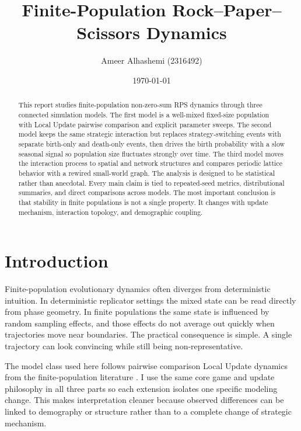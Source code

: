 \documentclass[11pt,a4paper]{article}
\title{Finite-Population Rock--Paper--Scissors Dynamics}
\author{Ameer Alhashemi (2316492)}
\date{\today}
\begin{document}
\raggedbottom
\maketitle
\onehalfspacing

\begin{abstract}
This report studies finite-population non-zero-sum RPS dynamics through three connected simulation models. The first model is a well-mixed fixed-size population with Local Update pairwise comparison and explicit parameter sweeps. The second model keeps the same strategic interaction but replaces strategy-switching events with separate birth-only and death-only events, then drives the birth probability with a slow seasonal signal so population size fluctuates strongly over time. The third model moves the interaction process to spatial and network structures and compares periodic lattice behavior with a rewired small-world graph. The analysis is designed to be statistical rather than anecdotal. Every main claim is tied to repeated-seed metrics, distributional summaries, and direct comparisons across models. The most important conclusion is that stability in finite populations is not a single property. It changes with update mechanism, interaction topology, and demographic coupling.
\end{abstract}

\section{Introduction}
Finite-population evolutionary dynamics often diverges from deterministic intuition. In deterministic replicator settings the mixed state can be read directly from phase geometry. In finite populations the same state is influenced by random sampling effects, and those effects do not average out quickly when trajectories move near boundaries. The practical consequence is simple. A single trajectory can look convincing while still being non-representative.

The model class used here follows pairwise comparison Local Update dynamics from the finite-population literature \cite{claussen2016,traulsen2006,nowak2006,claussen2007}. I use the same core game and update philosophy in all three parts so each extension isolates one specific modeling change. This makes interpretation cleaner because observed differences can be linked to demography or structure rather than to a complete change of strategic mechanism.
\end{document}
